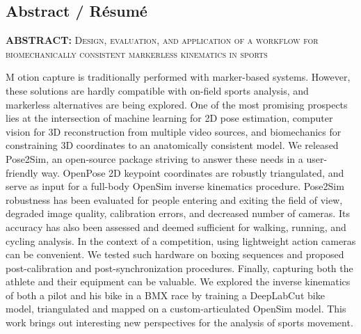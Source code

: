 {}

\vspace*{-1.6cm}
\begin{flushright}
\section*{\fontsize{20pt}{20pt}\selectfont\textnormal{Abstract / Résumé}}
\end{flushright}
\vspace{-.2cm}

\chead[\fancyplain{}{}]
      {\fancyplain{}{}}
\lfoot[\fancyplain{}{}]%
      {\fancyplain{}{}}
\cfoot[\fancyplain{}{\thepage}]
      {\fancyplain{}{\thepage}}
\rfoot[\fancyplain{}{}]%
     {\fancyplain{}{\scriptsize}}
     


\vspace*{1cm}

\noindent\textbf{ABSTRACT: } \textsc{Design, evaluation, and application of a workflow for biomechanically consistent markerless kinematics in sports}

\lettrine[lines=1]{M}{ }otion capture is traditionally performed with marker-based systems. However, these solutions are hardly compatible with on-field sports analysis, and markerless alternatives are being explored. One of the most promising prospects lies at the intersection of machine learning for 2D pose estimation, computer vision for 3D reconstruction from multiple video sources, and biomechanics for constraining 3D coordinates to an anatomically consistent model. We released Pose2Sim, an open-source package striving to answer these needs in a user-friendly way. OpenPose 2D keypoint coordinates are robustly triangulated, and serve as input for a full-body OpenSim inverse kinematics procedure. Pose2Sim robustness has been evaluated for people entering and exiting the field of view, degraded image quality, calibration errors, and decreased number of cameras. Its accuracy has also been assessed and deemed sufficient for walking, running, and cycling analysis. In the context of a competition, using lightweight action cameras can be convenient. We tested such hardware on boxing sequences and proposed post-calibration and post-synchronization procedures. Finally, capturing both the athlete and their equipment can be valuable. We explored the inverse kinematics of both a pilot and his bike in a BMX race by training a DeepLabCut bike model, triangulated and mapped on a custom-articulated OpenSim model. This work brings out interesting new perspectives for the analysis of sports movement.

